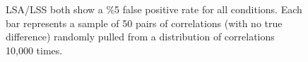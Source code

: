 \documentclass[10pt,letterpaper]{article}
\begin{document}
\begin{figure}[H]
  \centering


  \caption{
    LSA/LSS both show a \%5 false positive rate for all conditions.
    Each bar represents a sample of 50 pairs of correlations (with no true difference)
    randomly pulled from a distribution of correlations 10,000 times.
  }
  \label{fig:res_sim_fpr}
\end{figure}
\end{document}
